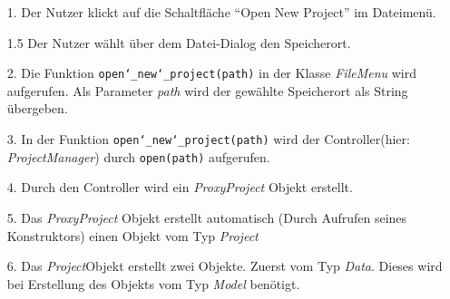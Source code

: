\documentclass{article}
\begin{document}
\begin{enumerate}
    \item[1.] Der Nutzer klickt auf die Schaltfläche 
    \enquote{Open New Project} im Dateimenü.
    \item[1.5] Der Nutzer wählt über dem Datei-Dialog den Speicherort.  
    \item[2.] Die Funktion \texttt{open\char`_new\char`_project(path)} in der Klasse \textit{FileMenu} wird aufgerufen. Als Parameter \textit{path} wird der gewählte Speicherort als String übergeben.
    \item[3.] In der Funktion \texttt{open\char`_new\char`_project(path)} wird der Controller(hier: \textit{ProjectManager}) durch \texttt{open(path)} aufgerufen.
    \item[4.] Durch den Controller wird ein \textit{ProxyProject} Objekt erstellt.
    \item[5.] Das \textit{ProxyProject} Objekt erstellt automatisch (Durch Aufrufen seines Konstruktors) einen Objekt vom Typ \textit{Project}
    \item[6.] Das \textit{Project}\textendash Objekt erstellt zwei Objekte. Zuerst vom Typ \textit{Data}. Dieses wird bei Erstellung des Objekts vom Typ \textit{Model} benötigt. 
\end{enumerate}
\end{document}
